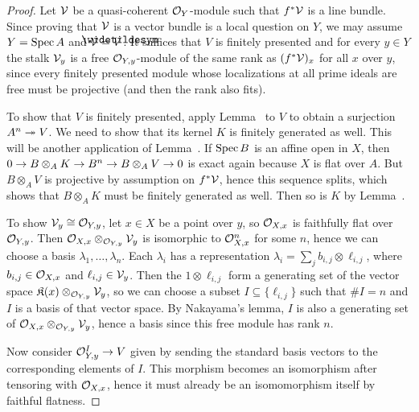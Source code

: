 \documentclass[a4paper,parskip=half,numbers=enddot, DIV=12]{scrreprt}
\begin{document}
\begin{proof}
	Let $\mathcal{V}$ be a quasi-coherent $\mathcal{O}_Y$-module such that $f^*\mathcal{V}$ is a line bundle. Since proving that $\mathcal{V}$ is a vector bundle is a local question on $Y$, we may assume $Y=\operatorname{Spec} A$ and $\Vv=\snake{V}$. It suffices that $V$ is finitely presented and for every $y\in Y$ the stalk $\mathcal{V}_y$ is a free $\mathcal{O}_{Y,y}$-module of the same rank as $(f^*\mathcal{V})_x$ for all $x$ over $y$, since every finitely presented module whose localizations at all prime ideals are free must be projective (and then the rank also fits).
	
	To show that $V$ is finitely presented, apply Lemma~ to $V$ to obtain a surjection $A^n\epimorphism V$. We need to show that its kernel $K$ is finitely generated as well. This will be another application of Lemma~. If $\operatorname{Spec} B$ is an affine open in $X$, then $0\morphism B\otimes_AK\morphism B^n\morphism B\otimes_AV\morphism 0$ is exact again because $X$ is flat over $A$. But $B\otimes_AV$ is projective by assumption on $f^*\mathcal{V}$, hence this sequence splits, which shows that $B\otimes_AK$ must be finitely generated as well. Then so is $K$ by Lemma~.
	
	To show $\mathcal{V}_y\cong \mathcal{O}_{Y,y}$, let $x\in X$ be a point over $y$, so $\mathcal{O}_{X,x}$ is faithfully flat over $\mathcal{O}_{Y,y}$. Then $\mathcal{O}_{X,x}\otimes_{\mathcal{O}_{Y,y}}\mathcal{V}_y$ is isomorphic to $\mathcal{O}_{X,x}^n$ for some $n$, hence we can choose a basis $\lambda_1,\ldots,\lambda_n$. Each $\lambda_i$ has a representation $\lambda_i=\sum_jb_{i,j}\otimes\ell_{i,j}$, where $b_{i,j}\in\mathcal{O}_{X,x}$ and $\ell_{i,j}\in \mathcal{V}_y$. Then the $1\otimes\ell_{i,j}$ form a generating set of the vector space $\mathfrak{K}(x)\otimes_{\mathcal{O}_{Y,y}}\mathcal{V}_y$, so we can choose a subset $I\subseteq\{\ell_{i,j}\}$ such that $\#I=n$ and $I$ is a basis of that vector space. By Nakayama's lemma, $I$ is also a generating set of $\mathcal{O}_{X,x}\otimes_{\mathcal{O}_{Y,y}}\mathcal{V}_y$, hence a basis since this free module has rank $n$.
	
	 Now consider $\Oo_{Y,y}^I\morphism V$ given by sending the standard basis vectors to the corresponding elements of $I$. This morphism becomes an isomorphism after tensoring with $\mathcal{O}_{X,x}$, hence it must already be an isomomorphism itself by faithful flatness.
\end{proof}
\end{document}
